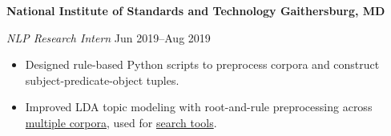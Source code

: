 \textbf{National Institute of Standards and Technology \hfill Gaithersburg, MD}\par

\textit{NLP Research Intern} \hfill Jun 2019--Aug 2019
\begin{itemize}
	\item Designed rule-based Python scripts to preprocess corpora and construct subject-predicate-object tuples.
	\item Improved LDA topic modeling with root-and-rule preprocessing across \href{https://github.com/petezh/RR-NLP-Tools}{multiple corpora}, used for \href{https://randr.nist.gov/mgi/Default.aspx}{search tools}.
\end{itemize}\par